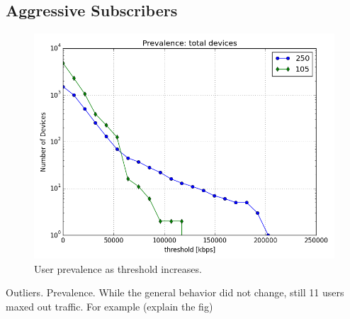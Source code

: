 \subsection{Aggressive Subscribers}\label{subsec:prevalence}

\begin{figure}[ht]
\begin{minipage}{\linewidth}
\centering
\includegraphics[width=\linewidth]{figures/prevalence.png}
\caption{User prevalence as threshold increases.}
\label{fig:prevalence}
\end{minipage}
\end{figure}

Outliers. Prevalence.
While the general behavior did not change, still 11 users maxed out traffic.
For example (explain the fig)